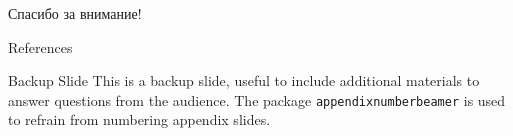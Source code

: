 \documentclass{beamer}
\begin{document}

\begin{frame}[focus]
	Спасибо за внимание!
\end{frame}


\appendix

\begin{frame}{References}
	\nocite{*} %
	
	
\end{frame}


\begin{frame}{Backup Slide}
	This is a backup slide, useful to include additional materials to answer questions from the audience.
	\vfill
	The package \texttt{appendixnumberbeamer} is used to refrain from numbering appendix slides.
\end{frame}

\end{document}
